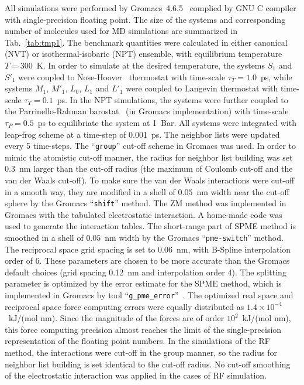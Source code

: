 \documentclass[aip,jcp,a4paper,preprint,unsortedaddress,onecolumn,fleqn]{revtex4-1}
\newcommand{\systemsb}{S_1}
\newcommand{\systemsbp}{S'_1}
\newcommand{\systemmb}{M_1}
\newcommand{\systemmbp}{M'_1}
\newcommand{\systemla}{L_0}
\newcommand{\systemlbp}{L'_1}
\newcommand{\systemlb}{L_1}
\begin{document}
All simulations were performed by Gromacs~4.6.5~\cite{hess2008gromacs, pronk2013gromacs} complied by GNU C compiler with single-precision floating point.
The size of the systems and corresponding number of molecules used for MD simulations are summarized in Tab.~\ref{tab:tmp1}.
The benchmark quantities were calculated in either  canonical (NVT) or isothermal-isobaric (NPT) ensemble, with equilibrium temperature $T=300$~K.
In order to simulate at the desired temperature,
the systems $\systemsb$ and $\systemsbp$ were coupled to Nose-Hoover~\cite{nose1984molecular,hoover1985canonical} thermostat with time-scale $\tau_T = 1.0$~ps,
while systems $\systemmb$, $\systemmbp$, $\systemla$, $\systemlb$ and $\systemlbp$ were coupled to Langevin thermostat with time-scale $\tau_T = 0.1$~ps.
In the NPT simulations, the systems were further coupled
to the Parrinello-Rahman barostat~\cite{parrinello1980crystal,parrinello1981polymorphic} (in Gromacs implementation)
with time-scale $\tau_P = 0.5$~ps to equilibriate the system at 1~Bar.
All systems were integrated with leap-frog scheme at a time-step of 0.001~ps.
The neighbor lists were updated every 5 time-steps.
The ``\texttt{group}'' cut-off scheme in Gromacs was used. In order to mimic the atomistic
cut-off manner, the radius for neighbor list building was set 0.3~nm
larger than the cut-off radius (the maximum of Coulomb cut-off and the van der Waals cut-off).
To make sure the van der Waals interactions were cut-off in a smooth way,
they are modified in a shell of $0.05$~nm width near the cut-off sphere by the Gromacs ``\texttt{shift}'' method.
The ZM method was implemented in Gromacs with the tabulated electrostatic interaction. A home-made code was used to generate the interaction tables.
The short-range part of SPME method is smoothed in a shell of $0.05$~nm width  by the Gromacs ``\texttt{pme-switch}'' method.
The reciprocal space
grid spacing is set to 0.06~nm, with B-Spline interpolation order of 6.
These parameters are chosen to be more accurate than the Gromacs default choices (grid spacing 0.12~nm and interpolation order 4).
The splitting parameter is optimized by the error estimate for the SPME method, which is implemented in Gromacs by tool ``\texttt{g\_pme\_error}''~\cite{wang2010optimizing}.
The optimized real space and reciprocal space force computing errors were equally distributed as $1.4\times10^{-4}$~kJ/(mol nm).
Since the magnitude of the forces are of order $10^{2}$~kJ/(mol nm), this force computing precision almost reaches the limit of the single-precision representation of the floating point numbers.
In the simulations of the RF method, the interactions were cut-off in the group manner,
so the radius for neighbor list building is set identical to the cut-off radius.
No cut-off smoothing of the electrostatic interaction was applied in the cases of RF simulation.
\end{document}
